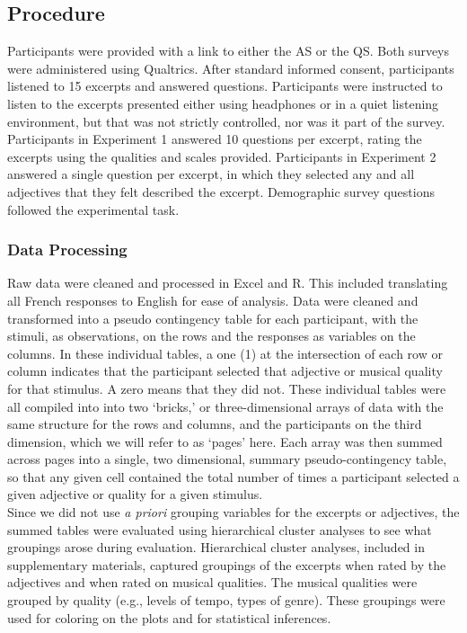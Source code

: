 \documentclass[
  english,
  man,floatsintext]{apa6}
\begin{document}
\hypertarget{procedure}{%
\subsection{Procedure}\label{procedure}}

Participants were provided with a link to either the AS or the QS. Both surveys were administered using Qualtrics. After standard informed consent, participants listened to 15 excerpts and answered questions. Participants were instructed to listen to the excerpts presented either using headphones or in a quiet listening environment, but that was not strictly controlled, nor was it part of the survey. Participants in Experiment 1 answered 10 questions per excerpt, rating the excerpts using the qualities and scales provided. Participants in Experiment 2 answered a single question per excerpt, in which they selected any and all adjectives that they felt described the excerpt. Demographic survey questions followed the experimental task.

\hypertarget{data-processing}{%
\subsubsection{Data Processing}\label{data-processing}}

Raw data were cleaned and processed in Excel and R. This included translating all French responses to English for ease of analysis. Data were cleaned and transformed into a pseudo contingency table for each participant, with the stimuli, as observations, on the rows and the responses as variables on the columns. In these individual tables, a one (1) at the intersection of each row or column indicates that the participant selected that adjective or musical quality for that stimulus. A zero means that they did not. These individual tables were all compiled into into two `bricks,' or three-dimensional arrays of data with the same structure for the rows and columns, and the participants on the third dimension, which we will refer to as `pages' here. Each array was then summed across pages into a single, two dimensional, summary pseudo-contingency table, so that any given cell contained the total number of times a participant selected a given adjective or quality for a given stimulus.\\
Since we did not use \emph{a priori} grouping variables for the excerpts or adjectives, the summed tables were evaluated using hierarchical cluster analyses to see what groupings arose during evaluation. Hierarchical cluster analyses, included in supplementary materials, captured groupings of the excerpts when rated by the adjectives and when rated on musical qualities. The musical qualities were grouped by quality (e.g., levels of tempo, types of genre). These groupings were used for coloring on the plots and for statistical inferences.
\end{document}
